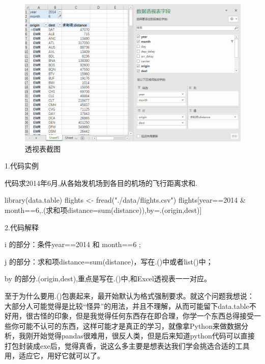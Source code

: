 \documentclass[
]{book}
\newenvironment{Shaded}{\begin{snugshade}}{\end{snugshade}}
\newcommand{\AttributeTok}[1]{\textcolor[rgb]{0.77,0.63,0.00}{#1}}
\newcommand{\DecValTok}[1]{\textcolor[rgb]{0.00,0.00,0.81}{#1}}
\newcommand{\FunctionTok}[1]{\textcolor[rgb]{0.00,0.00,0.00}{#1}}
\newcommand{\NormalTok}[1]{#1}
\newcommand{\OtherTok}[1]{\textcolor[rgb]{0.56,0.35,0.01}{#1}}
\newcommand{\SpecialCharTok}[1]{\textcolor[rgb]{0.00,0.00,0.00}{#1}}
\newcommand{\StringTok}[1]{\textcolor[rgb]{0.31,0.60,0.02}{#1}}
\begin{document}
\begin{figure}
\centering
\includegraphics{./picture/data-table/01picture.png}
\caption{透视表截图}
\end{figure}

1.代码实例

代码求2014年6月,从各始发机场到各目的机场的飞行距离求和.

\begin{Shaded}
\begin{Highlighting}[]
\FunctionTok{library}\NormalTok{(data.table)}
\NormalTok{flights }\OtherTok{\textless{}{-}} \FunctionTok{fread}\NormalTok{(}\StringTok{"./data/flights.csv"}\NormalTok{)}
\NormalTok{flights[year}\SpecialCharTok{==}\DecValTok{2014} \SpecialCharTok{\&}\NormalTok{ month}\SpecialCharTok{==}\DecValTok{6}\NormalTok{,.(求和项}\AttributeTok{distance=}\FunctionTok{sum}\NormalTok{(distance)),by}\OtherTok{=}\NormalTok{.(origin,dest)]}
\end{Highlighting}
\end{Shaded}

2.代码解释

i 的部分：条件year==2014 和 month==6 ;

j 的部分：求和项distance=sum(distance)，写在.()中或者list()中；

by 的部分.(origin,dest),重点是写在.()中,和Excel透视表一一对应。

至于为什么要用.()包裹起来，最开始默认为格式强制要求。就这个问题我想说：大部分人可能觉得是比较``怪异''的用法，并且不理解，从而可能留下data.table不好用，很古怪的印象，但是我觉得任何东西存在即合理，你学一个东西总得接受一些你可能不认可的东西，这样可能才是真正的学习，就像拿Python来做数据分析，我刚开始觉得pandas很难用，很反人类，但是后来知道python代码可以直接打包封装成exe后，觉得真香，说这么多主要是想表达我们学会挑选合适的工具用，适应它，用好它就可以了。
\end{document}
